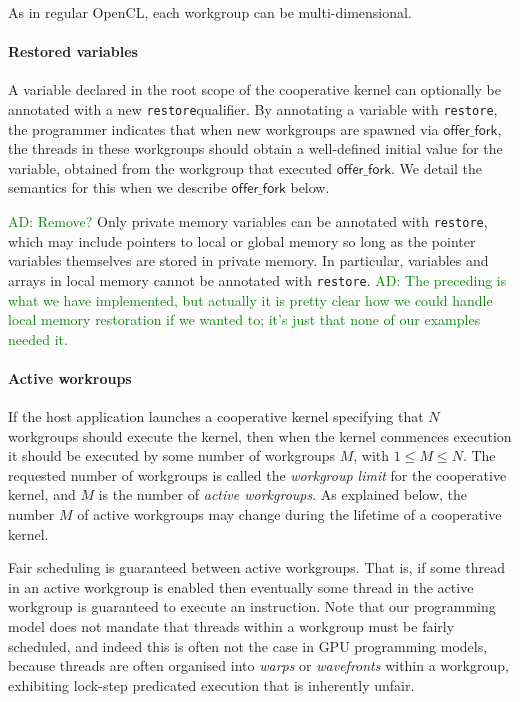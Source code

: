 \documentclass[nocopyrightspace]{sigplanconf-pldi16}
\newcommand{\ADComment}[1]{\textcolor{green}{AD: #1}}
\newcommand{\restore}{\texttt{restore}}
\newcommand{\offerfork}{\mathsf{offer\_fork}}
\begin{document}
As in regular OpenCL, each workgroup can be multi-dimensional.

\paragraph{Restored variables}

A variable declared in the root scope of the cooperative kernel can
optionally be annotated with a new \restore qualifier.  By
annotating a variable with \restore, the programmer indicates
that when new workgroups are spawned via $\offerfork$, the threads in
these workgroups should obtain a well-defined initial value for the
variable, obtained from the workgroup that executed $\offerfork$.  We
detail the semantics for this when we describe $\offerfork$ below.

\ADComment{Remove?}
Only private memory variables can be annotated with \restore,
which may include pointers to local or global memory so long as the
pointer variables themselves are stored in private memory.  In
particular, variables and arrays in local memory cannot be annotated
with \restore.  \ADComment{The preceding is what we have
  implemented, but actually it is pretty clear how we could handle
  local memory restoration if we wanted to; it's just that none of our
  examples needed it.}

\paragraph{Active workroups}

If the host application launches a cooperative kernel specifying that
$N$ workgroups should execute the kernel, then when the kernel
commences execution it should be executed by some number of workgroups
$M$, with $1\leq M \leq N$.  The requested number of workgroups is
called the \emph{workgroup limit} for the cooperative kernel, and $M$
is the number of \emph{active workgroups}.  As explained below, the
number $M$ of active workgroups may change during the lifetime of a
cooperative kernel.

Fair scheduling is guaranteed between active workgroups.  That is, if
some thread in an active workgroup is enabled then eventually some
thread in the active workgroup is guaranteed to execute an
instruction.  Note that our programming model does not mandate that
threads within a workgroup must be fairly scheduled, and indeed this
is often not the case in GPU programming models, because threads are
often organised into \emph{warps} or \emph{wavefronts} within a
workgroup, exhibiting lock-step predicated execution that is
inherently unfair.
\end{document}
